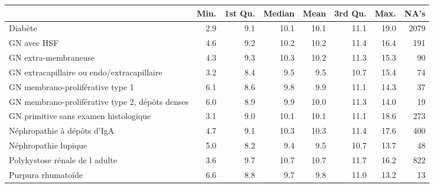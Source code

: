 \documentclass[11pt,a4paper]{article}\usepackage[]{graphicx}\usepackage[]{color}
\begin{document}
\begin{table}[ht]
\centering
\begin{tabular}{lrrrrrrr}
  \hline
 & Min. & 1st Qu. & Median & Mean & 3rd Qu. & Max. & NA's \\ 
  \hline
Diabète & 2.9 & 9.1 & 10.1 & 10.1 & 11.1 & 19.0 & 2079 \\ 
  GN avec HSF & 4.6 & 9.2 & 10.2 & 10.2 & 11.4 & 16.4 & 191 \\ 
  GN extra-membraneuse & 4.3 & 9.3 & 10.3 & 10.2 & 11.3 & 15.3 & 90 \\ 
  GN extracapillaire ou endo/extracapillaire & 3.2 & 8.4 & 9.5 & 9.5 & 10.7 & 15.4 & 74 \\ 
  GN membrano-proliférative type 1 & 6.1 & 8.6 & 9.8 & 9.9 & 11.1 & 14.3 & 37 \\ 
  GN membrano-proliférative type 2, dépôts denses & 6.0 & 8.9 & 9.9 & 10.0 & 11.3 & 14.0 & 19 \\ 
  GN primitive sans examen histologique & 3.1 & 9.0 & 10.1 & 10.1 & 11.1 & 18.6 & 273 \\ 
  Néphropathie à dépôts d'IgA & 4.7 & 9.1 & 10.3 & 10.3 & 11.4 & 17.6 & 400 \\ 
  Néphropathie lupique & 5.0 & 8.2 & 9.4 & 9.5 & 10.7 & 13.7 & 48 \\ 
  Polykystose rénale de l adulte & 3.6 & 9.7 & 10.7 & 10.7 & 11.7 & 16.2 & 822 \\ 
  Purpura rhumatoïde & 6.6 & 8.8 & 9.7 & 9.8 & 11.0 & 13.2 & 13 \\ 
   \hline
\end{tabular}
\end{table}



% 
% 
% 
% 
\end{document}
